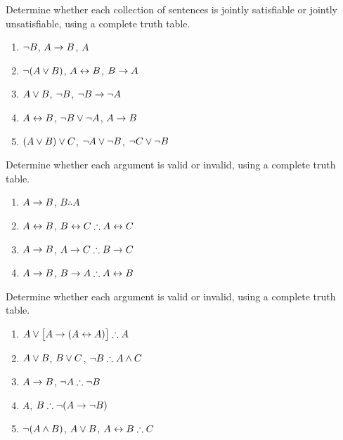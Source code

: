 \noindent\problempart
\label{pr.TT.satisfiable3}
Determine whether each collection of sentences is jointly satisfiable or jointly unsatisfiable, using a complete truth table.
\begin{enumerate}
\item $\neg B$, $A \rightarrow B$, $A$ \vspace{.5ex}%
\item $\neg(A \vee B)$, $A \leftrightarrow B$, $B \rightarrow A$\vspace{.5ex} %
\item $A \vee B$, $\neg B$, $\neg B \rightarrow \neg A$\vspace{.5ex} %
\item $A \leftrightarrow B$, $\neg B \vee \neg A$, $A \rightarrow B$\vspace{.5ex} %
\item $(A \vee B) \vee C$, $\neg A \vee \neg B$, $\neg C \vee \neg B$\vspace{.5ex} %
\end{enumerate}
\noindent\problempart
\label{pr.TT.valid2}
Determine whether each argument is valid or invalid, using a complete truth table.
\begin{enumerate}
\item $A\rightarrow B$, $B \therefore  A$ %
\item $A\leftrightarrow B$, $B\eiff C \therefore A\eiff C$ %
\item $A \rightarrow B$, $A \eif C\therefore B \eif C$ %
\item $A \rightarrow B$, $B \eif A\therefore A \eiff B$ %
\end{enumerate}

\noindent\problempart
\label{pr.TT.valid3}
Determine whether each argument is valid or invalid, using a complete truth table.
\begin{enumerate}
\item $A\eor\bigl[A\eif(A\eiff A)\bigr] \therefore  A $\vspace{.5ex}%
\item $A\vee B$, $B\vee C$, $\enot B \therefore A \eand C$\vspace{.5ex} %
\item $A \rightarrow B$, $\enot A\therefore \enot B$ \vspace{.5ex}%
\item $A$, $B\therefore \enot(A\eif \enot B)$ \vspace{.5ex}%
\item $\neg(A \wedge B)$, $A \vee B$, $A \eiff B\therefore C$ \vspace{.5ex}%
\end{enumerate}

